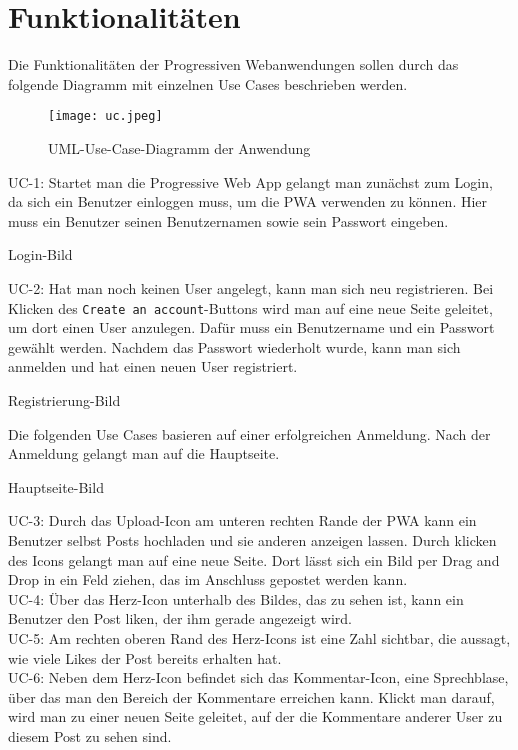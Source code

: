 \chapter{Funktionalitäten}

Die Funktionalitäten der Progressiven Webanwendungen sollen durch das folgende Diagramm mit einzelnen Use Cases beschrieben werden.

\begin{figure}
    \centering
    \texttt{[image: uc.jpeg]}
    \caption{UML-Use-Case-Diagramm der Anwendung}
    \label{img:uc}
\end{figure}

UC-1:
Startet man die Progressive Web App gelangt man zunächst zum Login, da sich ein Benutzer einloggen muss, um die PWA verwenden zu können. Hier muss ein Benutzer seinen Benutzernamen sowie sein Passwort eingeben.

Login-Bild

UC-2: 
Hat man noch keinen User angelegt, kann man sich neu registrieren. Bei Klicken des \texttt{Create an account}-Buttons wird man auf eine neue Seite geleitet, um dort einen User anzulegen. Dafür muss ein Benutzername und ein Passwort gewählt werden. Nachdem das Passwort wiederholt wurde, kann man sich anmelden und hat einen neuen User registriert. 

Registrierung-Bild

Die folgenden Use Cases basieren auf einer erfolgreichen Anmeldung. Nach der Anmeldung gelangt man auf die Hauptseite.

Hauptseite-Bild

UC-3: 
Durch das Upload-Icon am unteren rechten Rande der PWA kann ein Benutzer selbst Posts hochladen und sie anderen anzeigen lassen. Durch klicken des Icons gelangt man auf eine neue Seite. Dort lässt sich ein Bild per Drag and Drop in ein Feld ziehen, das im Anschluss gepostet werden kann. \\

UC-4:
Über das Herz-Icon unterhalb des Bildes, das zu sehen ist, kann ein Benutzer den Post liken, der ihm gerade angezeigt wird.\\

UC-5:
Am rechten oberen Rand des Herz-Icons ist eine Zahl sichtbar, die aussagt, wie viele Likes der Post bereits erhalten hat.\\

UC-6:
Neben dem Herz-Icon befindet sich das Kommentar-Icon, eine Sprechblase, über das man den Bereich der Kommentare erreichen kann. Klickt man darauf, wird man zu einer neuen Seite geleitet, auf der die Kommentare anderer User zu diesem Post zu sehen sind. \\

